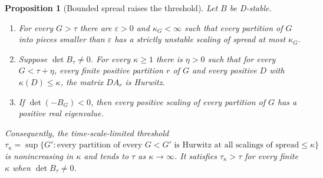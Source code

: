 \documentclass[11pt,a4paper]{article}
\theoremstyle{plain}
\newtheorem{proposition}[theorem]{Proposition}
\theoremstyle{definition}
\theoremstyle{remark}
\begin{document}
\begin{proposition}[Bounded spread raises the threshold]\label{prop:spread}
Let $B$ be D-stable.
\begin{enumerate}[label=(\alph*)]
\item For every $G>\tau$ there are $\varepsilon>0$ and $\kappa_G<\infty$ such that
every partition of $G$ into pieces smaller than $\varepsilon$ has a strictly
unstable scaling of spread at most $\kappa_G$.
\item Suppose $\det B_\tau\ne0$. For every $\kappa\ge1$ there is $\eta>0$ such
that for every $G<\tau+\eta$, every finite positive partition $r$ of $G$ and
every positive $D$ with $\kappa(D)\le\kappa$, the matrix $DA_r$ is Hurwitz.
\item If $\det(-B_G)<0$, then every positive scaling of every partition of $G$
has a positive real eigenvalue.
\end{enumerate}
Consequently, the time-scale-limited threshold
$\tau_\kappa=\sup\{G':\text{every partition of every }G<G'\text{ is Hurwitz at
all scalings of spread}\le\kappa\}$ is nonincreasing in $\kappa$ and tends to
$\tau$ as $\kappa\to\infty$. It satisfies $\tau_\kappa>\tau$ for every finite
$\kappa$ when $\det B_\tau\ne0$.
\end{proposition}
\end{document}
